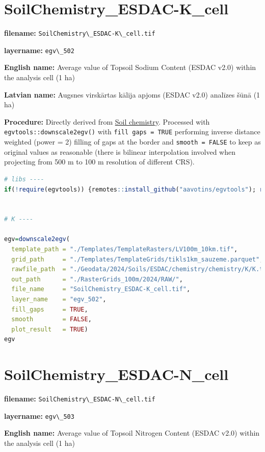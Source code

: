 \documentclass[
]{book}
\newcommand{\passthrough}[1]{#1}
\begin{document}
\section{SoilChemistry\_ESDAC-K\_cell}\label{ch06.502}

\textbf{filename:} \passthrough{\lstinline!SoilChemistry\_ESDAC-K\_cell.tif!}

\textbf{layername:} \passthrough{\lstinline!egv\_502!}

\textbf{English name:} Average value of Topsoil Sodium Content (ESDAC v2.0) within the analysis cell (1 ha)

\textbf{Latvian name:} Augsnes virskārtas kālija apjoms (ESDAC v2.0) analīzes šūnā (1 ha)

\textbf{Procedure:} Directly derived from \hyperref[Ch04.07.01]{Soil chemistry}. Processed
with \passthrough{\lstinline!egvtools::downscale2egv()!} with \passthrough{\lstinline!fill gaps = TRUE!} performing inverse
distance weighted (power = 2) filling of gaps at the border and \passthrough{\lstinline!smooth = FALSE!}
to keep as original values as reasonable (there is bilinear interpolation
involved when projecting from 500 m to 100 m resolution of different CRS).

\begin{lstlisting}[language=R]
# libs ----
if(!require(egvtools)) {remotes::install_github("aavotins/egvtools"); require(egvtools)}


# K ----

egv=downscale2egv(
  template_path = "./Templates/TemplateRasters/LV100m_10km.tif",
  grid_path     = "./Templates/TemplateGrids/tikls1km_sauzeme.parquet",
  rawfile_path  = "./Geodata/2024/Soils/ESDAC/chemistry/chemistry/K/K.tif",
  out_path      = "./RasterGrids_100m/2024/RAW/",
  file_name     = "SoilChemistry_ESDAC-K_cell.tif",
  layer_name    = "egv_502",
  fill_gaps     = TRUE,
  smooth        = FALSE,
  plot_result   = TRUE)
egv
\end{lstlisting}

\section{SoilChemistry\_ESDAC-N\_cell}\label{ch06.503}

\textbf{filename:} \passthrough{\lstinline!SoilChemistry\_ESDAC-N\_cell.tif!}

\textbf{layername:} \passthrough{\lstinline!egv\_503!}

\textbf{English name:} Average value of Topsoil Nitrogen Content (ESDAC v2.0) within the analysis cell (1 ha)
\end{document}
